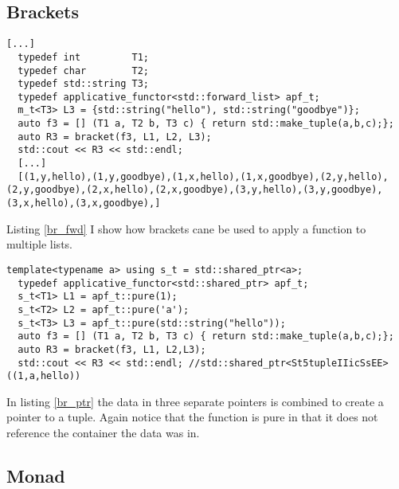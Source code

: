 \documentclass[12pt,fleqn]{article}
\begin{document}
%
%
%
\subsection{Brackets}
%
\begin{lstlisting}[caption=applicative functor for the std::forward\_list using brackets, label=br_fwd]
[...]
  typedef int         T1;
  typedef char        T2;
  typedef std::string T3;
  typedef applicative_functor<std::forward_list> apf_t;
  m_t<T3> L3 = {std::string("hello"), std::string("goodbye")};
  auto f3 = [] (T1 a, T2 b, T3 c) { return std::make_tuple(a,b,c);};
  auto R3 = bracket(f3, L1, L2, L3);
  std::cout << R3 << std::endl;
  [...]
  [(1,y,hello),(1,y,goodbye),(1,x,hello),(1,x,goodbye),(2,y,hello),(2,y,goodbye),(2,x,hello),(2,x,goodbye),(3,y,hello),(3,y,goodbye),(3,x,hello),(3,x,goodbye),]
\end{lstlisting}

Listing \ref{br_fwd} I show how brackets cane be used to apply a function to multiple lists.

\begin{lstlisting}[caption=applicative functor for shared pointers applied using bracket notation, label=br_ptr]
  template<typename a> using s_t = std::shared_ptr<a>;
  typedef applicative_functor<std::shared_ptr> apf_t;
  s_t<T1> L1 = apf_t::pure(1);
  s_t<T2> L2 = apf_t::pure('a');
  s_t<T3> L3 = apf_t::pure(std::string("hello"));
  auto f3 = [] (T1 a, T2 b, T3 c) { return std::make_tuple(a,b,c);};
  auto R3 = bracket(f3, L1, L2,L3);
  std::cout << R3 << std::endl; //std::shared_ptr<St5tupleIIicSsEE>((1,a,hello))
\end{lstlisting}

In listing \ref{br_ptr} the data in three separate pointers is combined to create a pointer to a tuple.
Again notice that the function is pure in that it does not reference the container the data was in.
  
%
%
\subsection{Monad}
%
  
  
\end{document}
